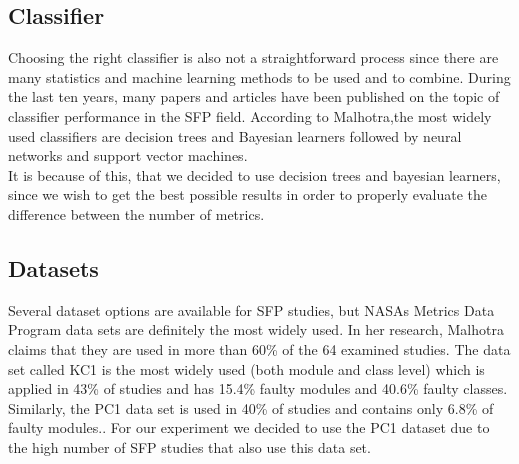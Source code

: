 \subsection{Classifier}
Choosing the right classifier is also not a straightforward process since there are many statistics and machine learning methods to be used and to combine. During the last ten years, many papers and articles have been published on the topic of classifier performance in the SFP field. According to Malhotra\cite{malhotra2015systematic},the most widely used classifiers are decision trees and Bayesian learners followed by neural networks and support vector machines\cite[p.~11]{malhotra2015systematic}.\\
It is because of this, that we decided to use decision trees and bayesian learners, since we wish to get the best possible results in order to properly evaluate the difference between the number of metrics.
\subsection{Datasets}
Several dataset options are available for SFP studies, but NASAs Metrics Data Program data sets are definitely the most widely used. In her research, Malhotra\cite{malhotra2015systematic} claims that they are used in more than 60\% of the 64 examined studies. The data set called KC1 is the most widely used (both module and class level) which is applied in 43\% of studies and
has 15.4\% faulty modules and 40.6\% faulty classes. Similarly, the PC1 data set is used in 40\% of studies and contains only 6.8\% of faulty modules.\cite[p.~17]{malhotra2015systematic}. For our experiment we decided to use the PC1 dataset due to the high number of SFP studies that also use this data set. 